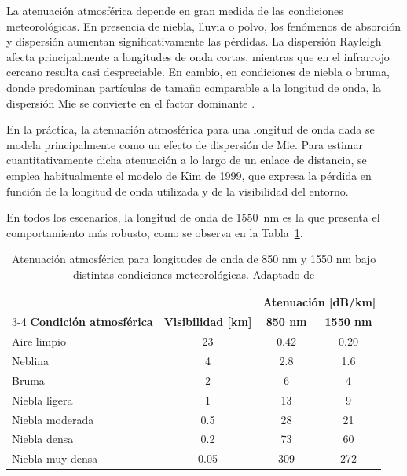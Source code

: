 La atenuación atmosférica depende en gran medida de las condiciones meteorológicas. En presencia de niebla, lluvia o polvo, los fenómenos de absorción y dispersión aumentan significativamente las pérdidas. La dispersión Rayleigh afecta principalmente a longitudes de onda cortas, mientras que en el infrarrojo cercano resulta casi despreciable. En cambio, en condiciones de niebla o bruma, donde predominan partículas de tamaño comparable a la longitud de onda, la dispersión Mie se convierte en el factor dominante \cite{Trichili}. 

En la práctica, la atenuación atmosférica para una longitud de onda dada se modela principalmente como un efecto de dispersión de Mie. Para estimar cuantitativamente dicha atenuación a lo largo de un enlace de distancia, se emplea habitualmente el modelo de Kim de 1999, que expresa la pérdida en función de la longitud de onda utilizada y de la visibilidad del entorno.

En todos los escenarios, la longitud de onda de \SI{1550}{\nano\meter} es la que presenta el comportamiento más robusto, como se observa en la Tabla~\ref{Tabla1}.

\begin{table}[H]
\centering
\setlength{\tabcolsep}{10pt}
\renewcommand{\arraystretch}{1.2}
\begin{tabular}{lccc}
 & & \multicolumn{2}{c}{\textbf{Atenuación [dB/km]}} \\
\cline{3-4}
\textbf{Condición atmosférica} & \textbf{Visibilidad [km]} & \textbf{850 nm} & \textbf{1550 nm} \\
\hline
Aire limpio        & 23   & 0.42  & 0.20 \\
Neblina            & 4    & 2.8   & 1.6  \\
Bruma              & 2    & 6     & 4    \\
Niebla ligera      & 1    & 13    & 9    \\
Niebla moderada    & 0.5  & 28    & 21   \\
Niebla densa       & 0.2  & 73    & 60   \\
Niebla muy densa   & 0.05 & 309   & 272  \\
\hline
\end{tabular}
\caption{Atenuación atmosférica para longitudes de onda de 850 nm y 1550 nm bajo distintas condiciones meteorológicas. Adaptado de \cite{Trichili}}
\label{Tabla1}
\end{table}


